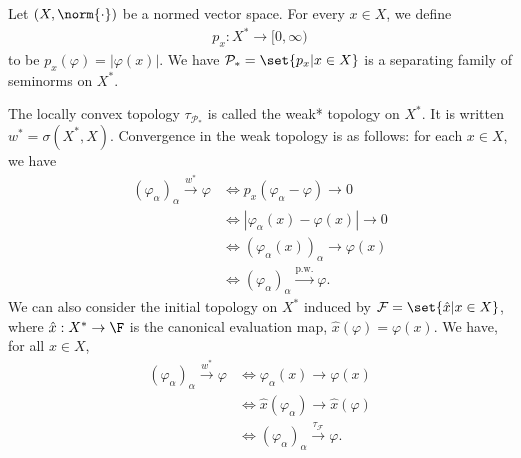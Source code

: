 \documentclass[10pt]{mypackage}
\begin{document}
\begin{example}
  Let $\left(X,\norm{\cdot}\right)$ be a normed vector space. For every $x\in X$, we define
  \begin{align*}
    p_x: X^{\ast}\rightarrow [0,\infty)
  \end{align*}
  to be $p_x\left(\varphi\right) = \left\vert \varphi\left(x\right) \right\vert$. We have $\mathcal{P}_{\ast} = \set{p_x| x\in X}$ is a separating family of seminorms on $X^{\ast}$.\newline

  The locally convex topology $\tau_{\mathcal{P}_{\ast}}$ is called the weak* topology on $X^{\ast}$. It is written $w^{\ast} = \sigma\left(X^{\ast},X\right)$. Convergence in the weak topology is as follows: for each $x\in X$, we have
  \begin{align*}
    \left(\varphi_{\alpha}\right)_{\alpha}\xrightarrow{w^{\ast}}\varphi &\Leftrightarrow p_x\left(\varphi_{\alpha} - \varphi\right) \rightarrow 0\\
                                                                        &\Leftrightarrow \left\vert \varphi_{\alpha}(x) - \varphi(x) \right\vert\rightarrow 0\\
                                                                        &\Leftrightarrow \left(\varphi_{\alpha}(x)\right)_{\alpha}\rightarrow \varphi(x)\\
                                                                        &\Leftrightarrow \left(\varphi_{\alpha}\right)_{\alpha}\xrightarrow{\text{p.w.}}\varphi.
  \end{align*}
  We can also consider the initial topology on $X^{\ast}$ induced by $\mathcal{F} = \set{\hat{x} | x\in X}$, where $\hat{x}: X^{\ast}\rightarrow \F$ is the canonical evaluation map, $\hat{x}\left(\varphi\right) = \varphi(x)$. We have, for all $x\in X$,
  \begin{align*}
    \left(\varphi_{\alpha}\right)_{\alpha}\xrightarrow{w^{\ast}} \varphi &\Leftrightarrow \varphi_{\alpha}\left(x\right) \rightarrow \varphi\left(x\right)\\
                                                                         &\Leftrightarrow \hat{x}\left(\varphi_{\alpha}\right)\rightarrow \hat{x}\left(\varphi\right)\\
                                                                         &\Leftrightarrow \left(\varphi_{\alpha}\right)_{\alpha}\xrightarrow{\tau_{\mathcal{F}}}\varphi.
  \end{align*}

\end{example}
\end{document}
